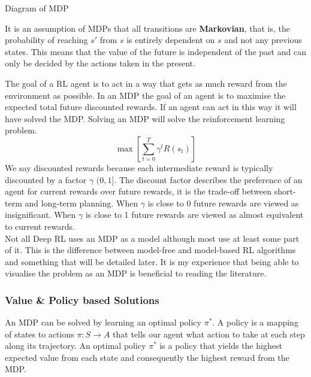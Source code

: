 \documentclass[10pt,journal,compsoc]{IEEEtran}
\begin{document}
Diagram of MDP

It is an assumption of MDPs that all transitions are \textbf{Markovian}, that is, the probability of reaching \begin{math}s'\end{math} from  \begin{math}s\end{math} is entirely dependent on  \begin{math}s\end{math} and not any previous states. This means that the value of the future is independent of the past and can only be decided by the actions taken in the present.

The goal of a RL agent is to act in a way that gets as much reward from the environment as possible. In an MDP the goal of an agent is to maximise the expected total future discounted rewards. If an agent can act in this way it will have solved the MDP. Solving an MDP will solve the reinforcement learning problem.
\begin{equation}
\label{mdp_goal}
\max[\sum\limits_{t=0}^{T} \gamma^tR(s_t)] %
\end{equation}
We say discounted rewards because each intermediate reward is typically discounted by a factor \begin{math}\gamma\end{math}  \begin{math}(0,1]\end{math}. The discount factor describes the preference of an agent for current rewards over future rewards, it is the trade-off between short-term and long-term planning. When  \begin{math}\gamma\end{math} is close to 0 future rewards are viewed as insignificant. When  \begin{math}\gamma\end{math} is close to 1 future rewards are viewed as almost equivalent to current rewards.
\\
Not all Deep RL uses an MDP as a model although most use at least some part of it. This is the difference between model-free and model-based RL algorithms and something that will be detailed later. It is my experience that being able to visualise the problem as an MDP is beneficial to reading the literature.
\subsubsection{Value \& Policy based Solutions}
An MDP can be solved by learning an optimal policy \begin{math}\pi^*\end{math}. A policy is a mapping of states to actions \begin{math}\pi : S \rightarrow A\end{math} that tells our agent what action to take at each step along its trajectory. An optimal policy \begin{math}\pi^*\end{math} is a policy that yields the highest expected value from each state and consequently the highest reward from the MDP.
\end{document}
